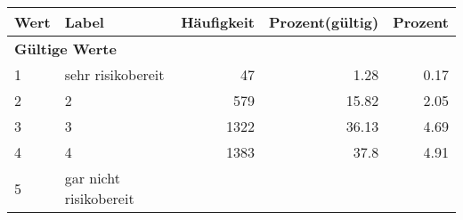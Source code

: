      \begin{longtable}{lXrrr}
     \toprule
     \textbf{Wert} & \textbf{Label} & \textbf{Häufigkeit} & \textbf{Prozent(gültig)} & \textbf{Prozent} \\
     \endhead
     \midrule
     \multicolumn{5}{l}{\textbf{Gültige Werte}}\\

     1 &
     \multicolumn{1}{X}{ sehr risikobereit   } &


       \num{47} &
       \num[round-mode=places,round-precision=2]{1,28} &
         \num[round-mode=places,round-precision=2]{0,17} \\

     2 &
     \multicolumn{1}{X}{ 2   } &


       \num{579} &
       \num[round-mode=places,round-precision=2]{15,82} &
         \num[round-mode=places,round-precision=2]{2,05} \\

     3 &
     \multicolumn{1}{X}{ 3   } &


       \num{1322} &
       \num[round-mode=places,round-precision=2]{36,13} &
         \num[round-mode=places,round-precision=2]{4,69} \\

     4 &
     \multicolumn{1}{X}{ 4   } &


       \num{1383} &
       \num[round-mode=places,round-precision=2]{37,8} &
         \num[round-mode=places,round-precision=2]{4,91} \\

     5 &
     \multicolumn{1}{X}{ gar nicht risikobereit   } &



\end{longtable}
